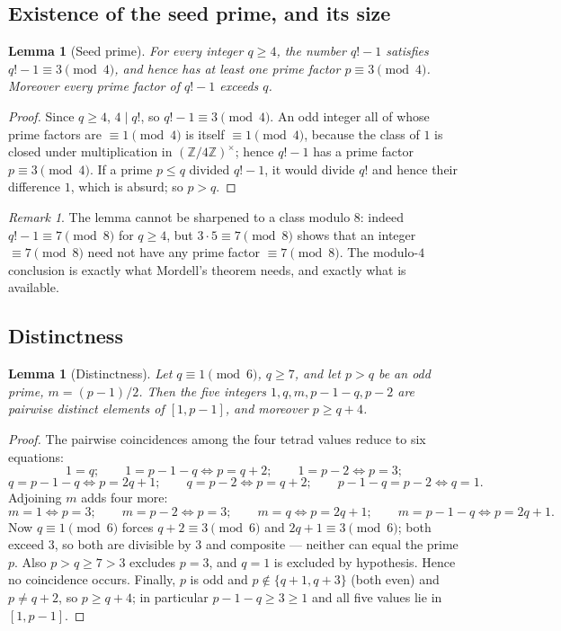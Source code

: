 \documentclass[11pt]{article}
\newtheorem{lemma}[theorem]{Lemma}
\theoremstyle{definition}
\theoremstyle{remark}
\newtheorem{remark}[theorem]{Remark}
\newcommand{\Z}{\mathbb{Z}}
\begin{document}
\subsection{Existence of the seed prime, and its size}

\begin{lemma}[Seed prime]\label{lem:seed}
For every integer $q \ge 4$, the number $q! - 1$ satisfies
$q! - 1 \equiv 3 \pmod 4$, and hence has at least one prime factor
$p \equiv 3 \pmod 4$. Moreover every prime factor of $q!-1$ exceeds $q$.
\end{lemma}

\begin{proof}
Since $q \ge 4$, $4 \mid q!$, so $q! - 1 \equiv 3 \pmod 4$. An odd integer
all of whose prime factors are $\equiv 1 \pmod 4$ is itself $\equiv 1 \pmod
4$, because the class of $1$ is closed under multiplication in
$(\Z/4\Z)^{\times}$; hence $q!-1$ has a prime factor $p \equiv 3 \pmod 4$.
If a prime $p \le q$ divided $q!-1$, it would divide $q!$ and hence their
difference $1$, which is absurd; so $p > q$.
\end{proof}

\begin{remark}\label{rem:mod8}
The lemma cannot be sharpened to a class modulo $8$: indeed
$q! - 1 \equiv 7 \pmod 8$ for $q \ge 4$, but $3 \cdot 5 \equiv 7 \pmod 8$
shows that an integer $\equiv 7 \pmod 8$ need not have any prime factor
$\equiv 7 \pmod 8$. The modulo-$4$ conclusion is exactly what
Mordell's theorem needs, and exactly what is available.
\end{remark}

\subsection{Distinctness}

\begin{lemma}[Distinctness]\label{lem:distinct}
Let $q \equiv 1 \pmod 6$, $q \ge 7$, and let $p > q$ be an odd prime,
$m = (p-1)/2$. Then the five integers $1, q, m, p-1-q, p-2$ are pairwise
distinct elements of $[1, p-1]$, and moreover $p \ge q + 4$.
\end{lemma}

\begin{proof}
The pairwise coincidences among the four tetrad values reduce to six
equations:
\[
  1 = q; \qquad
  1 = p-1-q \iff p = q+2; \qquad
  1 = p-2 \iff p = 3;
\]
\[
  q = p-1-q \iff p = 2q+1; \qquad
  q = p-2 \iff p = q+2; \qquad
  p-1-q = p-2 \iff q = 1.
\]
Adjoining $m$ adds four more:
\[
  m = 1 \iff p = 3; \qquad
  m = p-2 \iff p = 3; \qquad
  m = q \iff p = 2q+1; \qquad
  m = p-1-q \iff p = 2q+1.
\]
Now $q \equiv 1 \pmod 6$ forces $q + 2 \equiv 3 \pmod 6$ and
$2q + 1 \equiv 3 \pmod 6$; both exceed $3$, so both are divisible by $3$ and
composite --- neither can equal the prime $p$. Also $p > q \ge 7 > 3$
excludes $p = 3$, and $q = 1$ is excluded by hypothesis. Hence no coincidence
occurs. Finally, $p$ is odd and $p \notin \{q+1, q+3\}$ (both even) and
$p \ne q + 2$, so $p \ge q + 4$; in particular $p - 1 - q \ge 3 \ge 1$ and
all five values lie in $[1, p-1]$.
\end{proof}
\end{document}
